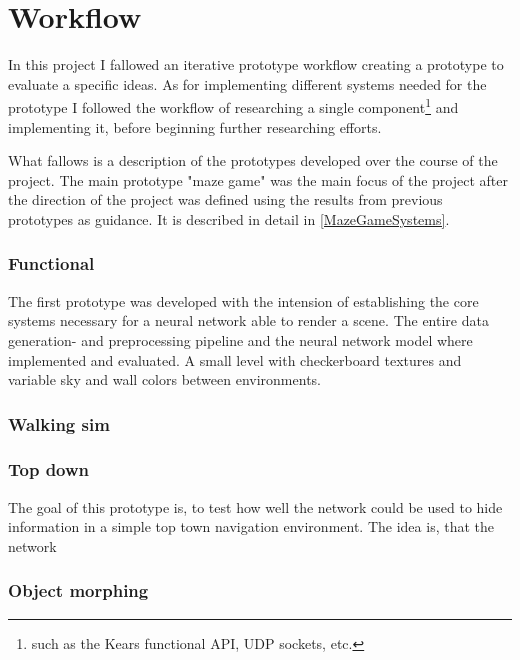 
\chapter{Workflow}
In this project I fallowed an iterative prototype workflow creating a prototype to evaluate a specific ideas. As for implementing different systems needed for the prototype I followed the workflow of researching a single component\footnote{such as the Kears functional API, UDP sockets, etc.} and implementing it, before beginning further researching efforts.

What fallows is a description of the prototypes developed over the course of the project. The main prototype "maze game" was the main focus of the project after the direction of the project was defined using the results from previous prototypes as guidance. It is described in detail in \cref{MazeGameSystems}.


\subsection{Functional}
The first prototype was developed with the intension of establishing the core systems necessary for a neural network able to render a scene. The entire data generation- and preprocessing pipeline and the neural network model where implemented and evaluated. A small level with checkerboard textures and variable sky and wall colors between environments.



\subsection{Walking sim}


\subsection{Top down}
The goal of this prototype is, to test how well the network could be used to hide information in a simple top town navigation environment.
The idea is, that the network



\subsection{Object morphing}

